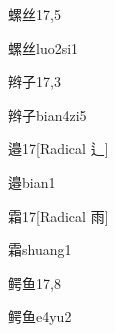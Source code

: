 \begin{entry}{螺丝}{17,5}
  \begin{phonetics}{螺丝}{luo2si1}
  \end{phonetics}
\end{entry}

\begin{entry}{辫子}{17,3}
  \begin{phonetics}{辫子}{bian4zi5}
  \end{phonetics}
\end{entry}

\begin{entry}{邉}{17}[Radical 辶]
  \begin{phonetics}{邉}{bian1}
  \end{phonetics}
\end{entry}

\begin{entry}{霜}{17}[Radical 雨]
  \begin{phonetics}{霜}{shuang1}
  \end{phonetics}
\end{entry}

\begin{entry}{鳄鱼}{17,8}
  \begin{phonetics}{鳄鱼}{e4yu2}
  \end{phonetics}
\end{entry}


